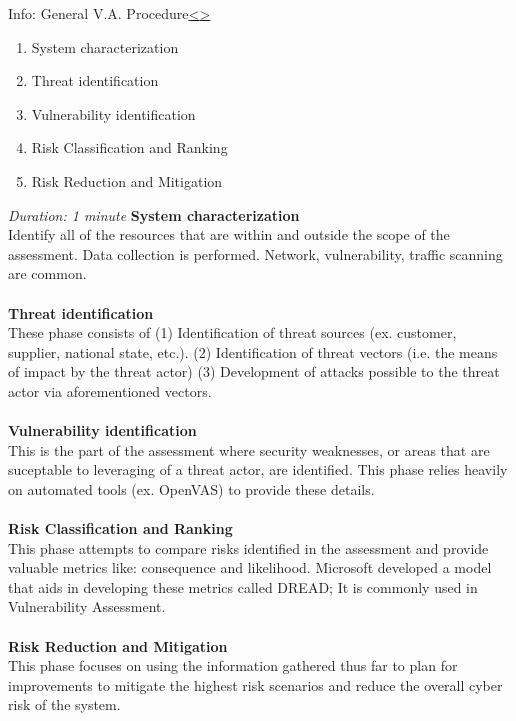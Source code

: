 \documentclass[12pt]{extarticle}
\newenvironment{instructionblock}{\Large\bgroup}{\egroup}
\newcommand{\ben}{\begin{enumerate}}
\newcommand{\een}{\end{enumerate}}
\newcounter{next}
\newcounter{prev}
\begin{document}
\pagebreak
{}
\begin{slide}{Info: General V.A. Procedure}{\hyperref[slide \theprev]{\textless}\hyperref[slide \thenext]{\textgreater}}
	\begin{instructionblock}
		\ben
		\item System characterization
		\item Threat identification
		\item Vulnerability identification
		\item Risk Classification and Ranking
		\item Risk Reduction and Mitigation
		\een
	\end{instructionblock}
\end{slide}
\textit{Duration: 1 minute}
\vfill
\noindent
\textbf{System characterization}\\
Identify all of the resources that are within and outside the scope of the assessment. Data collection is performed. Network, vulnerability, traffic scanning are common.\cite{KnappLangill} \\\\
\textbf{Threat identification}\\
These phase consists of (1) Identification of threat sources (ex. customer, supplier, national state, etc.). (2) Identification of threat vectors (i.e. the means of impact by the threat actor) (3) Development of attacks possible to the threat actor via aforementioned vectors. \cite{KnappLangill}\\\\
\textbf{Vulnerability identification}\\
This is the part of the assessment where security weaknesses, or areas that are suceptable to leveraging of a threat actor, are identified. This phase relies heavily on automated tools (ex. OpenVAS) to provide these details. \cite{KnappLangill}\\\\
\textbf{Risk Classification and Ranking}\\
This phase attempts to compare risks identified in the assessment and provide valuable metrics like: consequence and likelihood. Microsoft developed a model that aids in developing these metrics called DREAD; It is commonly used in Vulnerability Assessment. \cite{KnappLangill}\\\\
\textbf{Risk Reduction and Mitigation}\\
This phase focuses on using the information gathered thus far to plan for improvements to mitigate the highest risk scenarios and reduce the overall cyber risk of the system. \cite{KnappLangill}
\pagebreak
\end{document}
